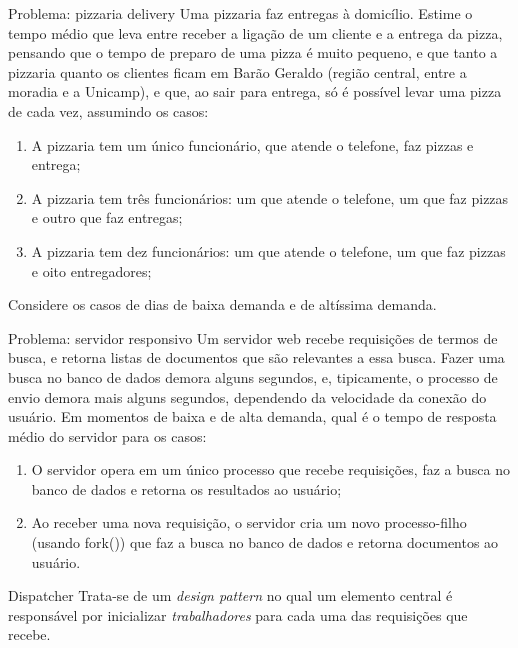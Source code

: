 \documentclass{beamer}
\begin{document}
\begin{frame}[fragile]{Problema: pizzaria delivery}
  \centering
  \Large
  Uma pizzaria faz entregas à domicílio. Estime o tempo médio que leva entre
  receber a
  ligação de um cliente e a entrega da pizza, pensando que o tempo de preparo de
  uma pizza é muito pequeno, e que tanto a pizzaria quanto os clientes ficam
  em Barão
  Geraldo (região central, entre a moradia e a Unicamp), e que, ao sair para
  entrega, só é possível levar uma pizza de cada vez, assumindo os casos:
  \begin{enumerate}
    \item A pizzaria tem um único funcionário, que atende o telefone, faz pizzas
      e entrega;
    \item A pizzaria tem três funcionários: um que atende o telefone, um que faz
      pizzas e outro que faz entregas;
    \item A pizzaria tem dez funcionários: um que atende o telefone, um que
      faz pizzas e oito entregadores;
  \end{enumerate}
  Considere os casos de dias de baixa demanda e de altíssima demanda.
\end{frame}

\begin{frame}[fragile]{Problema: servidor responsivo}
  \centering
  \Large
  Um servidor web recebe requisições de termos de busca, e retorna listas de
  documentos que são relevantes a essa busca. Fazer uma busca no banco de dados
  demora alguns segundos, e, tipicamente, o processo de envio demora mais alguns
  segundos, dependendo da velocidade da conexão do usuário. Em momentos de baixa
  e de alta demanda, qual é o tempo de resposta médio do servidor para os casos:
  \begin{enumerate}
    \item O servidor opera em um único processo que recebe requisições, faz a
      busca no banco de dados e retorna os resultados ao usuário;
    \item Ao receber uma nova requisição, o servidor cria um novo processo-filho
      (usando fork()) que faz a busca no banco de dados e retorna documentos ao
      usuário.
  \end{enumerate}
\end{frame}

\begin{frame}[fragile]{Dispatcher}
  \centering
  \LARGE
  Trata-se de um \textit{design pattern} no qual um elemento central é
  responsável por inicializar \textit{trabalhadores} para cada uma das
  requisições que recebe.
\end{frame}
\end{document}
